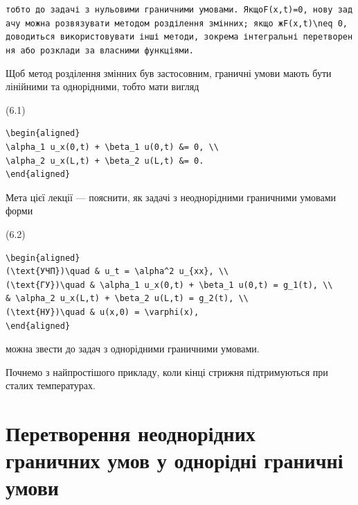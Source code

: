 \documentclass[
  ukrainian,
]{article}
\begin{document}
\texttt{тобто\ до\ задачі\ з\ нульовими\ граничними\ умовами.\ Якщо\textquotesingle{}F(x,t)=0\textquotesingle{},\ нову\ задачу\ можна\ розв\textquotesingle{}язувати\ методом\ розділення\ змінних;\ якщо\ ж\textquotesingle{}F(x,t)\textbackslash{}neq\ 0\textquotesingle{},\ доводиться\ використовувати\ інші\ методи,\ зокрема\ інтегральні\ перетворення\ або\ розклади\ за\ власними\ функціями.}

Щоб метод розділення змінних був застосовним, граничні умови мають бути
лінійними та однорідними, тобто мати вигляд

(6.1)

\begin{verbatim}
\begin{aligned}
\alpha_1 u_x(0,t) + \beta_1 u(0,t) &= 0, \\
\alpha_2 u_x(L,t) + \beta_2 u(L,t) &= 0.
\end{aligned}
\end{verbatim}

Мета цієї лекції --- пояснити, як задачі з неоднорідними граничними
умовами форми

(6.2)

\begin{verbatim}
\begin{aligned}
(\text{УЧП})\quad & u_t = \alpha^2 u_{xx}, \\
(\text{ГУ})\quad & \alpha_1 u_x(0,t) + \beta_1 u(0,t) = g_1(t), \\
& \alpha_2 u_x(L,t) + \beta_2 u(L,t) = g_2(t), \\
(\text{НУ})\quad & u(x,0) = \varphi(x),
\end{aligned}
\end{verbatim}

можна звести до задач з однорідними граничними умовами.

Почнемо з найпростішого прикладу, коли кінці стрижня підтримуються при
сталих температурах.

\section{Перетворення неоднорідних граничних умов у однорідні граничні
умови}\label{ux43fux435ux440ux435ux442ux432ux43eux440ux435ux43dux43dux44f-ux43dux435ux43eux434ux43dux43eux440ux456ux434ux43dux438ux445-ux433ux440ux430ux43dux438ux447ux43dux438ux445-ux443ux43cux43eux432-ux443-ux43eux434ux43dux43eux440ux456ux434ux43dux456-ux433ux440ux430ux43dux438ux447ux43dux456-ux443ux43cux43eux432ux438}
\end{document}

